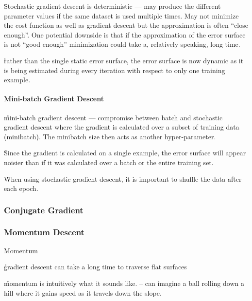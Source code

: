 \r{Stochastic gradient descent is deterministic --- may produce the different parameter values if the same dataset is used multiple times. May not minimize the cost function as well as gradient descent but the approximation is often ``close enough''. One potential downside is that if the approximation of the error surface is not ``good enough'' minimization could take a, relatively speaking, long time.}

\r{rather than the single static error surface, the error surface is now dynamic as it is being estimated during every iteration with respect to only one training example.}


\paragraph{Mini-batch Gradient Descent}

\r{mini-batch gradient descent --- compromise between batch and stochastic gradient descent where the gradient is calculated over a subset of training data (minibatch). The minibatch size then acts as another hyper-parameter.}

\r{Since the gradient is calculated on a single example, the error surface will appear noisier than if it was calculated over a batch or the entire training set.}

\r{When using stochastic gradient descent, it is important to shuffle the data after each epoch.}




\subsubsection{Conjugate Gradient}



\subsubsection{Momentum Descent}

Momentum~\cite{qian1999momentum}

\r{gradient descent can take a long time to traverse flat surfaces}

\r{momentum is intuitively what it sounds like. -- can imagine a ball rolling down a hill where it gains speed as it travels down the slope.}

